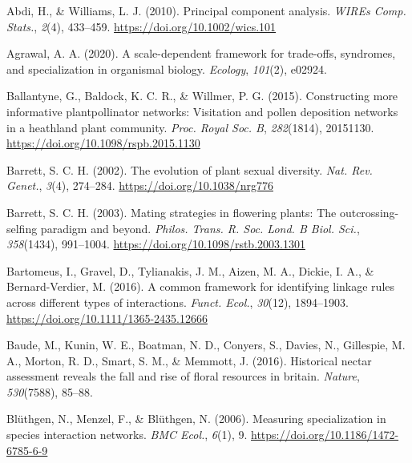 \documentclass[
  12pt,
  a4paper,
]{article}
\newlength{\cslhangindent}
\newlength{\cslentryspacingunit} %
\newenvironment{CSLReferences}[2] %
 {%
  \setlength{\parindent}{0pt}
  \ifodd #1
  \let\oldpar\par
  \def\par{\hangindent=\cslhangindent\oldpar}
  \fi
  \setlength{\parskip}{#2\cslentryspacingunit}
 }%
 {}
\begin{document}
\hypertarget{refs}{}
\begin{CSLReferences}{1}{0}
\leavevmode{}%
Abdi, H., \& Williams, L. J. (2010). Principal component analysis. \emph{WIREs Comp. Stats.}, \emph{2}(4), 433--459. \url{https://doi.org/10.1002/wics.101}

\leavevmode{}%
Agrawal, A. A. (2020). A scale-dependent framework for trade-offs, syndromes, and specialization in organismal biology. \emph{Ecology}, \emph{101}(2), e02924.

\leavevmode{}%
Ballantyne, G., Baldock, K. C. R., \& Willmer, P. G. (2015). Constructing more informative plant\textendash pollinator networks: Visitation and pollen deposition networks in a heathland plant community. \emph{Proc. Royal Soc. B}, \emph{282}(1814), 20151130. \url{https://doi.org/10.1098/rspb.2015.1130}

\leavevmode{}%
Barrett, S. C. H. (2002). The evolution of plant sexual diversity. \emph{Nat. Rev. Genet.}, \emph{3}(4), 274--284. \url{https://doi.org/10.1038/nrg776}

\leavevmode{}%
Barrett, S. C. H. (2003). Mating strategies in flowering plants: The outcrossing-selfing paradigm and beyond. \emph{Philos. Trans. R. Soc. Lond. B Biol. Sci.}, \emph{358}(1434), 991--1004. \url{https://doi.org/10.1098/rstb.2003.1301}

\leavevmode{}%
Bartomeus, I., Gravel, D., Tylianakis, J. M., Aizen, M. A., Dickie, I. A., \& Bernard-Verdier, M. (2016). A common framework for identifying linkage rules across different types of interactions. \emph{Funct. Ecol.}, \emph{30}(12), 1894--1903. \url{https://doi.org/10.1111/1365-2435.12666}

\leavevmode{}%
Baude, M., Kunin, W. E., Boatman, N. D., Conyers, S., Davies, N., Gillespie, M. A., Morton, R. D., Smart, S. M., \& Memmott, J. (2016). Historical nectar assessment reveals the fall and rise of floral resources in britain. \emph{Nature}, \emph{530}(7588), 85--88.

\leavevmode{}%
Blüthgen, N., Menzel, F., \& Blüthgen, N. (2006). Measuring specialization in species interaction networks. \emph{BMC Ecol.}, \emph{6}(1), 9. \url{https://doi.org/10.1186/1472-6785-6-9}


\end{CSLReferences}
\end{document}
